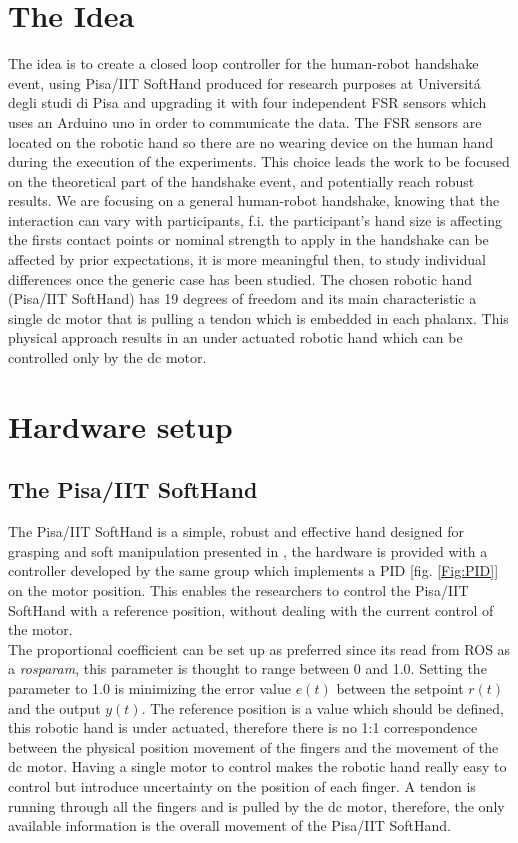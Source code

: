 \chapter{The Idea}
The idea is to create a closed loop controller for the human-robot handshake event, using Pisa/IIT SoftHand produced for research purposes at Universit\'a degli studi di Pisa and upgrading it with four independent FSR sensors which uses an Arduino uno in order to communicate the data.
The FSR sensors are located on the robotic hand so there are no wearing device on the human hand during the execution of the experiments.
This choice leads the work to be focused on the theoretical part of the handshake event, and potentially reach robust results. We are focusing on a general human-robot handshake, knowing that the interaction can vary with participants, f.i. the participant's hand size is affecting the firsts contact points or nominal strength to apply in the handshake can be affected by prior expectations, it is more meaningful then, to study individual differences once the generic case has been studied.
The chosen robotic hand (Pisa/IIT SoftHand) has 19 degrees of freedom and its main characteristic a single dc motor that is pulling a tendon which is embedded in each phalanx. This physical approach results in an under actuated robotic hand which can be controlled only by the dc motor. 

\chapter{Hardware setup}
\section{The Pisa/IIT SoftHand}
The Pisa/IIT SoftHand is a simple, robust and effective hand designed for grasping and soft manipulation presented in \cite{catalanopisa}, the hardware is provided with a controller developed by the same group which implements a PID [fig. \ref{Fig:PID}] on the motor position. This enables the researchers to control the Pisa/IIT SoftHand with a reference position, without dealing with the current control of the motor.\\
The proportional coefficient can be set up as preferred since its read from ROS as a \textit{rosparam}, this parameter is thought to range between 0 and 1.0. Setting the parameter to 1.0 is minimizing the error value $e(t)$  between the setpoint $r(t)$ and the output $y(t)$.
The reference position is a value which should be defined, this robotic hand is under actuated, therefore there is no 1:1 correspondence between the physical position movement of the fingers and the movement of the dc motor. Having a single motor to control makes the robotic hand really easy to control but introduce uncertainty on the position of each finger. A tendon is running through all the fingers and is pulled by the dc motor, therefore, the only available information is the overall movement of the Pisa/IIT SoftHand. 

